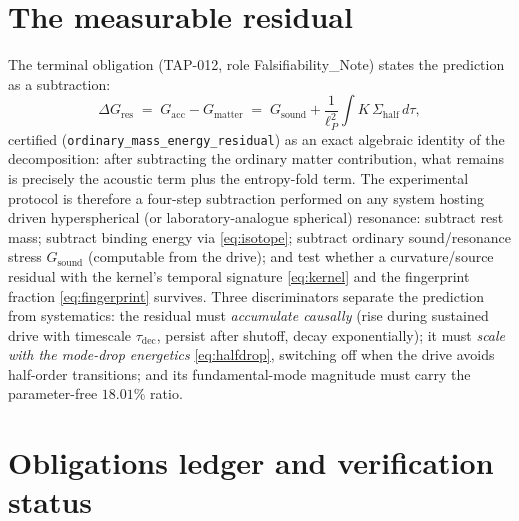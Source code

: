 \documentclass[11pt]{article}
\theoremstyle{remark}
\begin{document}
\section{The measurable residual}
\label{sec:residual}

The terminal obligation (TAP-012, role Falsifiability\_Note) states the prediction as a subtraction:
\begin{equation}
\Delta G_{\mathrm{res}} \;=\; G_{\mathrm{acc}} - G_{\mathrm{matter}} \;=\; G_{\mathrm{sound}} + \frac{1}{\ell_P^2} \int K\, \Sigma_{\mathrm{half}}\, d\tau,
\label{eq:residual}
\end{equation}
certified (\texttt{ordinary\_mass\_energy\_residual}) as an exact algebraic identity of the decomposition: after subtracting the ordinary matter contribution, what remains is precisely the acoustic term plus the entropy-fold term. The experimental protocol is therefore a four-step subtraction performed on any system hosting driven hyperspherical (or laboratory-analogue spherical) resonance: subtract rest mass; subtract binding energy via \eqref{eq:isotope}; subtract ordinary sound/resonance stress $G_{\mathrm{sound}}$ (computable from the drive); and test whether a curvature/source residual with the kernel's temporal signature \eqref{eq:kernel} and the fingerprint fraction \eqref{eq:fingerprint} survives. Three discriminators separate the prediction from systematics: the residual must \emph{accumulate causally} (rise during sustained drive with timescale $\tau_{\mathrm{dec}}$, persist after shutoff, decay exponentially); it must \emph{scale with the mode-drop energetics} \eqref{eq:halfdrop}, switching off when the drive avoids half-order transitions; and its fundamental-mode magnitude must carry the parameter-free $18.01\%$ ratio.

\section{Obligations ledger and verification status}
\label{sec:ledger}
\end{document}
